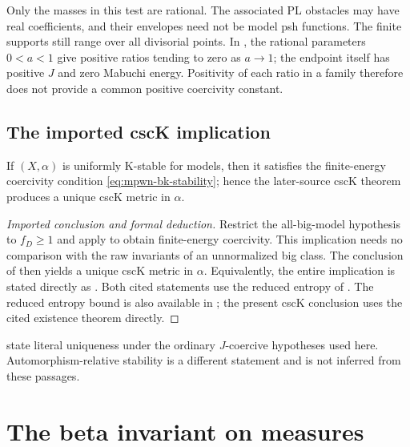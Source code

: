 Only the masses in this test are rational. The associated PL
obstacles may have real coefficients, and their envelopes need
not be model psh functions. The finite supports still range over
all divisorial points. In ,
the rational parameters $0<a<1$ give positive ratios tending to
zero as $a\to1$; the endpoint itself has positive $J$ and zero
Mabuchi energy. Positivity of each ratio in a family therefore
does not provide a common positive coercivity constant.

\subsection{The imported cscK implication}
\label{subsec:mpwn-k-csck}

\begin{corollary}\label{cor:mpwn-model-stability-csck}
If $(X,\alpha)$ is uniformly K-stable for models, then it satisfies the
finite-energy coercivity condition \eqref{eq:mpwn-bk-stability}; hence the
later-source cscK theorem produces a unique cscK metric in $\alpha$.
\end{corollary}

\begin{proof}[Imported conclusion and formal deduction]
Restrict the all-big-model hypothesis to $f_D\geq1$ and apply
 to obtain finite-energy coercivity.
This implication needs no comparison with the raw invariants of an
unnormalized big class.  The conclusion of
\cite[Theorem~2.4.3]{MPWN25} then yields a unique cscK metric in $\alpha$.
Equivalently, the entire implication is stated directly as
\cite[Corollary~9.2.2]{MPWN25}.  Both cited statements use the reduced
entropy of \cite[Definition~2.4.1]{MPWN25}.
The reduced entropy bound is also available in
; the present cscK conclusion uses the
cited existence theorem directly.
\end{proof}

\begin{remark}
\label{rem:mpwn-k-csck-scope}
\cite[Theorem~2.4.3 and Corollary~9.2.2]{MPWN25} state literal uniqueness
under the ordinary $J$-coercive hypotheses used here.
Automorphism-relative stability is a different statement and is not
inferred from these passages.
\end{remark}

\section{The beta invariant on measures}
\label{sec:mpwn-k-beta}


